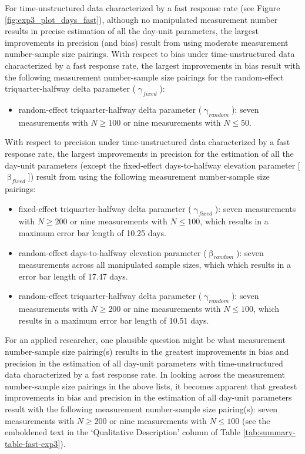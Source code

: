 \documentclass[
12pt, %
twoside,
english]{guelphthesis}
\theoremstyle{definition}
\theoremstyle{definition}
\theoremstyle{definition}
\theoremstyle{definition}
\theoremstyle{remark}
\begin{document}
For time-unstructured data characterized by a fast response rate (see Figure \ref{fig:exp3_plot_days_fast}), although no manipulated measurement number results in precise estimation of all the day-unit parameters, the largest improvements in precision (and bias) result from using moderate measurement number-sample size pairings. With respect to bias under time-unstructured data characterized by a fast response rate, the largest improvements in bias result with the following measurement number-sample size pairings for the random-effect triquarter-halfway delta parameter (\(\upgamma_{fixed}\)):
\begin{itemize}
\tightlist
\item
  random-effect triquarter-halfway delta parameter (\(\upgamma_{random}\)): seven measurements with \(N \ge 100\) or nine measurements with \(N \le 50\).
\end{itemize}
\noindent With respect to precision under time-unstructured data characterized by a fast response rate, the largest improvements in precision for the estimation of all the day-unit parameters (except the fixed-effect days-to-halfway elevation parameter {[}\(\upbeta_{fixed}\){]}) result from using the following measurement number-sample size pairings:
\begin{itemize}
\tightlist
\item
  fixed-effect triquarter-halfway delta parameter (\(\upgamma_{fixed}\)): seven measurements with \(N \ge 200\) or nine measurements with \(N \le 100\), which results in a maximum error bar length of 10.25 days.
\item
  random-effect days-to-halfway elevation parameter (\(\upbeta_{random}\)): seven measurements across all manipulated sample sizes, which which results in a error bar length of 17.47 days.
\item
  random-effect triquarter-halfway delta parameter (\(\upgamma_{random}\)): seven measurements with \(N \ge 200\) or nine measurements with \(N \le 100\), which results in a maximum error bar length of 10.51 days.
\end{itemize}
For an applied researcher, one plausible question might be what measurement number-sample size pairing(s) results in the greatest improvements in bias and precision in the estimation of all day-unit parameters with time-unstructured data characterized by a fast response rate. In looking across the measurement number-sample size pairings in the above lists, it becomes apparent that greatest improvements in bias and precision in the estimation of all day-unit parameters result with the following measurement number-sample size pairing(s): seven measurements with \(N \ge 200\) or nine measurements with \(N \le 100\) (see the emboldened text in the `Qualitative Description' column of Table \ref{tab:summary-table-fast-exp3}).
\end{document}
